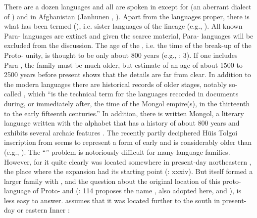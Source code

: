 There are a dozen  languages and all are spoken in  except for  (an aberrant dialect of ) and  in Afghanistan (Janhunen \citeyear{Janhunen2003}, \citeyear{Janhunen2006}). Apart from the  languages proper, there is what has been termed  (\citealt{Janhunen2003d,Janhunen2012d}), i.e. sister languages of the  lineage (e.g., ). All known Para- languages are extinct and given the scarce material, Para- languages will be excluded from the discussion. The age of the  , i.e. the time of the break-up of the Proto- unity, is thought to be only about 800 years (e.g., \citealt{Janhunen2012c}: 3). If one includes Para-, the family must be much older, but  estimate of an age of about 1500 to 2500 years before present shows that the details are far from clear. In addition to the modern  languages there are historical records of older stages, notably so-called , which “is the technical term for the  languages recorded in documents during, or immediately after, the time of the Mongol empire(s), in the thirteenth to the early fifteenth centuries.” \citep[57]{Rybatzki2003a} In addition, there is written Mongol, a literary language written with the  alphabet that has a history of about 800 years and exhibits several archaic features \citep{Janhunen2003b}. The recently partly deciphered Hüis Tolgoi inscription from  seems to represent a form of early  and is considerably older than  (e.g., \citealt{Vovin2017}). The “” problem is notoriously difficult for many language families. However, for  it quite clearly was located somewhere in present-day northeastern , the place where the  expansion had its starting point (\citealt{Janhunen2003}: xxxiv). But  itself formed a larger family with , and the question about the original location of this proto-language of Proto- and  (\citealt{Janhunen2012d}: 114 proposes the name \textit{}, also adopted here, and \citealt{Shimunek2014,Shimunek2017} \textit{}), is less easy to answer. \citet[10]{Janhunen2012b} assumes that it was located further to the south in present-day  or eastern Inner :

